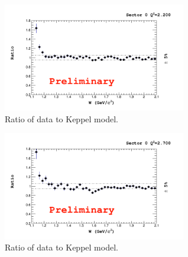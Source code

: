 \begin{figure}
  \centering
  \includegraphics[width=8cm]{image/crossSectionRatioSector0Slice2.png}
  \caption{Ratio of data to Keppel model.}
\end{figure}

\begin{figure}
  \centering
  \includegraphics[width=8cm]{image/crossSectionRatioSector0Slice4.png}
  \caption{Ratio of data to Keppel model.}
\end{figure}

